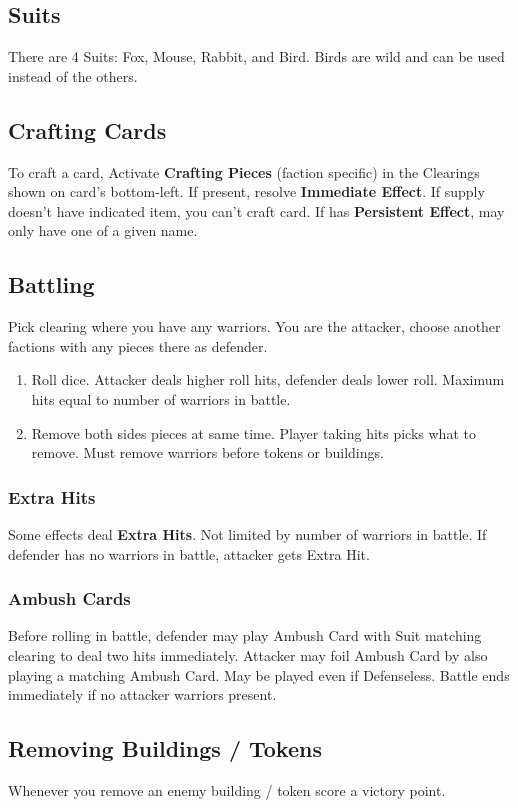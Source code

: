 \documentclass[12pt]{article}
\newenvironment{enumerateCustom}
{\begin{enumerate}
  \setlength{\itemsep}{1pt}
  \setlength{\parskip}{0pt}
  \setlength{\parsep}{0pt}}
{\end{enumerate}}
\begin{document}
\begin{multicols*}{2}
\subsection*{Suits}
There are 4 Suits: Fox, Mouse, Rabbit, and Bird. Birds are wild and can be used instead of the others.

\subsection*{Crafting Cards}
    To craft a card, Activate \textbf{Crafting Pieces} (faction specific) in the Clearings shown on card's bottom-left. If present, resolve \textbf{Immediate Effect}. If supply doesn't have indicated item, you can't craft card. If has \textbf{Persistent Effect}, may only have one of a given name.

\subsection*{Battling}
Pick clearing where you have any warriors. You are the attacker, choose another factions with any pieces there as defender.
    \begin{enumerateCustom}
        \item Roll dice. Attacker deals higher roll hits, defender deals lower roll. Maximum hits equal to number of warriors in battle.
        \item Remove both sides pieces at same time. Player taking hits picks what to remove. Must remove warriors before tokens or buildings.
    \end{enumerateCustom}

\subsubsection*{Extra Hits}
Some effects deal \textbf{Extra Hits}. Not limited by number of warriors in battle. If defender has no warriors in battle, attacker gets Extra Hit.

\subsubsection*{Ambush Cards}
Before rolling in battle, defender may play Ambush Card with Suit matching clearing to deal two hits immediately. Attacker may foil Ambush Card by also playing a matching Ambush Card. May be played even if Defenseless. Battle ends immediately if no attacker warriors present.

\subsection*{Removing Buildings / Tokens}
Whenever you remove an enemy building / token score a victory point.


\end{multicols*}
\end{document}
